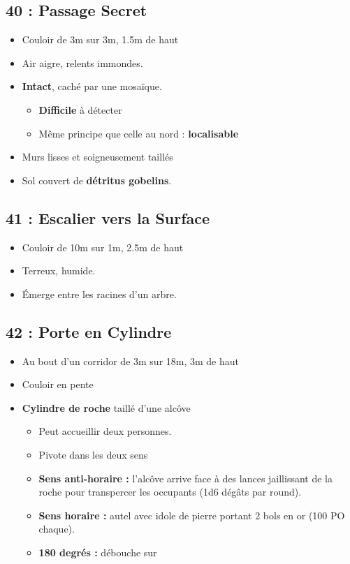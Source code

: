 \subsection{40 : Passage Secret}\label{n3:s40}
\begin{itemize}
  \item Couloir de 3m sur 3m, 1.5m de haut
  \item Air aigre, relents immondes.
  \item \textbf{Intact}, caché par une mosaïque.
  \begin{itemize}
    \item \textbf{Difficile} à détecter
    \item Même principe que celle au nord : \textbf{localisable}
  \end{itemize}
  \item Murs lisses et soigneusement taillés
  \item Sol couvert de \textbf{ détritus gobelins}.
\end{itemize}

\subsection{41 : Escalier vers la Surface}\label{n3:s41}
\begin{itemize}
  \item Couloir de 10m sur 1m, 2.5m de haut
  \item Terreux, humide.
  \item Émerge entre les racines d'un arbre.
\end{itemize}

\subsection{42 : Porte en Cylindre}\label{n3:s42}
  \begin{itemize}
    \item Au bout d'un corridor de 3m sur 18m, 3m de haut
    \item Couloir en pente
    \item \textbf{Cylindre de roche} taillé d'une alcôve
    \begin{itemize}
      \item Peut accueillir deux personnes.
      \item Pivote dans les deux sens
      \item \textbf{Sens anti-horaire :} l'alcôve arrive face à des lances jaillissant de la roche
      pour transpercer les occupants (1d6 dégâts par round).
      \item \textbf{Sens horaire :} autel avec idole de pierre portant 2 bols en or (100 PO chaque).
      \item \textbf{180 degrés :} débouche sur 
    \end{itemize}
\end{itemize}

